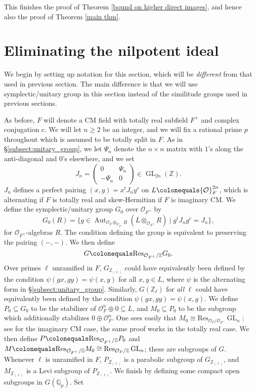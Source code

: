 \documentclass{amsart}
\theoremstyle{remark}
\numberwithin{equation}{subsection}
\newcommand{\Q}{\QQ}
\newcommand{\Z}{\ZZ}
\newcommand{\QQ}{{\mathbb Q}}
\newcommand{\ZZ}{{\mathbb Z}}
\newcommand{\cO}{{\mathcal O}}
\newcommand{\Qp}{\Q_p}
\DeclareMathOperator{\Aut}{Aut}
\DeclareMathOperator{\GL}{GL}
\newcommand{\sub}{\subseteq}
\newcommand{\defeq}{\colonequals}
\newcommand{\tensor}{\otimes}
\renewcommand{\(}{\left(}
\renewcommand{\)}{\right)}
\begin{document}
\noindent This finishes the proof of Theorem \ref{bound on higher direct images}, and hence also the proof of Theorem \ref{main thm}.

\section{Eliminating the nilpotent ideal}\label{Borel-Serre}

We begin by setting up notation for this section, which will be \emph{different} from that used in previous section. The main difference is that we will use symplectic/unitary group in this section instead of the similitude groups used in previous sections.

\medskip

As before, $F$ will denote a CM field with totally real subfield $F^+$ and complex conjugation $c$. We will let $n\geq 2$ be an integer, and we will fix a rational prime $p$ throughout which is assumed to be totally split in $F$. As in \S \ref{subsect:unitary_group}, we let $\Psi_n$ denote the $n\times n$ matrix with $1$'s along the anti-diagonal and $0$'s elsewhere, and we set
\[
J_n = \begin{pmatrix} 0 & \Psi_n \\ -\Psi_n & 0 \end{pmatrix}\in \GL_{2n}(\Z).
\]
$J_n$ defines a perfect pairing $(x,y) = x^t J_n y^c$ on $L \defeq \cO_F^{2n}$, which is alternating if $F$ is totally real and skew-Hermitian if $F$ is imaginary CM. We define the symplectic/unitary group $G_0$ over $\cO_{F^+}$ by
\[
G_0(R) = \{ g \in \Aut_{\cO_F\otimes_{\cO_{F^+}}R}( L \tensor_{\cO_{F^+}} R)  \mid g^t J_n g^c = J_n \},
\]
for $\cO_{F^+}$-algebras $R$. The condition defining the group is equivalent to preserving the pairing $(-,-)$. We then define 
\[
G \defeq \mathrm{Res}_{\cO_{F^+}/\Z}G_0.
\]
Over primes $\ell$ unramified in $F$, $G_{\Z_{(\ell)}}$ could have equivalently been defined by the condition $\psi(gx,gy)= \psi(x,y)$ for all $x,y\in L$, where $\psi$ is the alternating form in \S \ref{subsect:unitary_group}. Similarly, $G(\Z_\ell)$ for \emph{all} $\ell$ could have equivalently been defined by the condition $\psi(gx,gy)= \psi(x,y)$. We define $P_0 \sub G_0$ to be the stabilizer of $\cO_F^n \oplus 0 \sub L$, and $M_0 \sub P_0$ to be the subgroup which additionally stabilizes $0 \oplus \cO_F^n$. One sees easily that $M_0 \cong \mathrm{Res}_{\cO_F/\cO_{F^+}}\GL_n$; see \cite[Lemma 5.1(2)]{newton-thorne} for the imaginary CM case, the same proof works in the totally real case. We then define $P \defeq \mathrm{Res}_{\cO_{F^+}/\Z}P_0$ and $M \defeq \mathrm{Res}_{\cO_{F^+}/\Z}M_0 \cong \mathrm{Res}_{\cO_F/\Z}\GL_n$; these are subgroups of $G$. Whenever $\ell$ is unramified in $F$, $P_{Z_{(\ell)}}$ is a parabolic subgroup of $G_{\Z_{(\ell)}}$, and $M_{\Z_{(\ell)}}$ is a Levi subgroup of $P_{\Z_{(\ell)}}$. We finish by defining some compact open subgroups in $G(\Qp)$. Set
\end{document}
